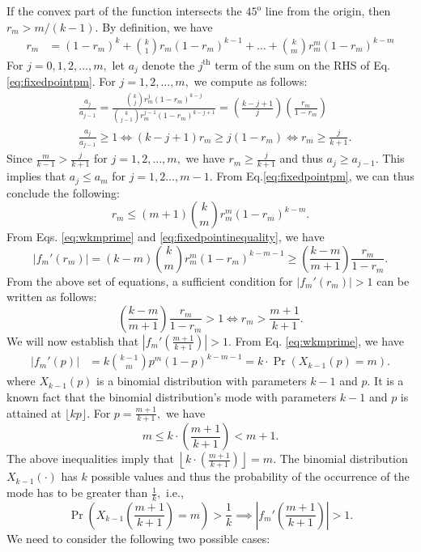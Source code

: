 \documentclass[12pt]{article}
\numberwithin{equation}{section}
\numberwithin{figure}{section}
\theoremstyle{definition}
\theoremstyle{plain}
\theoremstyle{plain}
\theoremstyle{plain}
\theoremstyle{remark}
\theoremstyle{plain}
\theoremstyle{plain}
\begin{document}
If the convex part of the function intersects the $45^{\text{o}}$ line from the origin, then $r_m > m/(k-1).$ By definition, we have
\begin{align}
   r_m &= (1-r_m)^k + \binom{k}{1}r_m(1-r_m)^{k-1} + \dots + \binom{k}{m}r_m^m(1-r_m)^{k-m}\label{eq:fixedpointpm}
\end{align}
For $j = 0,1,2,\dots,m,$ let $a_j$ denote the $j^{\text{th}}$ term of the sum on the RHS of Eq. \eqref{eq:fixedpointpm}. For $j = 1,2,\dots, m,$ we compute as follows:
\begin{align*}
    &\frac{a_j}{a_{j-1}} = \frac{\binom{k}{j}r_m^j(1-r_m)^{k-j}}{\binom{k}{j-1}r_m^{j-1}(1-r_m)^{k-j+1}}=\left(\frac{k-j+1}{j}\right)\left(\frac{r_m}{1-r_m}\right)\\
    &\frac{a_j}{a_{j-1}}\geq 1 \iff (k-j+1)r_m \geq j(1-r_m) \iff r_m \geq \frac{j}{k+1}.
\end{align*}
Since $\frac{m}{k-1} > \frac{j}{k+1}$ for $j =1,2,\dots, m,$ we have $r_m \geq \frac{j}{k+1}$ and thus $a_j \geq a_{j-1}$. This implies that $a_j \leq a_m$ for $j=1,2\dots,m-1.$ From Eq.\eqref{eq:fixedpointpm}, we can thus conclude the following:
\begin{equation}\label{eq:fixedpointinequality}
    r_m \leq (m+1)\binom{k}{m}r_m^m(1-r_m)^{k-m}.
\end{equation}
From Eqs. \eqref{eq:wkmprime} and \eqref{eq:fixedpointinequality}, we have
\[
|f_m'(r_m)| = (k-m)\binom{k}{m}r_m^m(1-r_m)^{k-m-1} \geq \left(\frac{k-m}{m+1}\right)\frac{r_m}{1-r_m}.
\]
From the above set of equations, a sufficient condition for $|f_m'(r_m)| > 1$ can be written as follows:
\begin{equation}\label{eq:suffcondmodgeq1}
\left(\frac{k-m}{m+1}\right)\frac{r_m}{1-r_m} > 1 \iff r_m > \frac{m+1}{k+1}.
\end{equation}
We will now establish that $|f_m'\left(\frac{m+1}{k+1} \right)| > 1.$ From Eq. \eqref{eq:wkmprime}, we have
\begin{align*}
    |f_m'(p)| &= k\binom{k-1}{m}p^m(1-p)^{k-m-1} = k\cdot \Pr (X_{k-1}(p) = m).
\end{align*}
where $X_{k-1}(p)$ is a binomial distribution with parameters $k-1$ and $p.$ It is a known fact that the binomial distribution's mode with parameters $k-1$ and $p$ is attained at $\lfloor kp \rfloor.$ For $p = \frac{m+1}{k+1},$ we have 
\[
m \leq  k\cdot \left(\frac{m+1}{k+1}\right)  < m+1.
\]
The above inequalities imply that 
$\left \lfloor k\cdot \left(\frac{m+1}{k+1}\right) \right \rfloor = m.$ The binomial distribution $X_{k-1}(\cdot)$ has $k$ possible values and thus the probability of the occurrence of the mode has to be greater than $\frac{1}{k},$ i.e.,
\[
\Pr\left(X_{k-1}\left(\frac{m+1}{k+1}\right)= m \right) > \frac{1}{k} \implies \left|f_m'\left(\frac{m+1}{k+1} \right)\right| > 1.
\]
We need to consider the following two possible cases:
\end{document}
